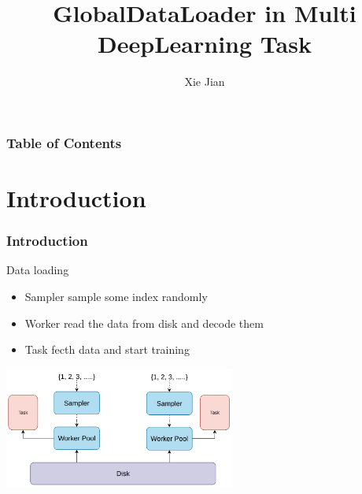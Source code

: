 \documentclass[notheorems, aspectratio=54]{beamer}
\title[GlobalDataLoader in Multi DeepLearning Task]{GlobalDataLoader in Multi DeepLearning Task}
\author{Xie Jian}
\institute[]{I2EC, ICS, NJU}
\begin{document}
\begin{frame}
    \titlepage
\end{frame}


\begin{frame}
    \frametitle{Table of Contents}
    \tableofcontents
\end{frame}

\section{Introduction}
\begin{frame}
    \frametitle{Introduction}
    \begin{block}{Data loading}
        \begin{itemize}
            \item Sampler sample some index randomly
            \item Worker read the data from disk and decode them
            \item Task fecth data and start training
        \end{itemize}
    \end{block}
    \begin{center}
        \includegraphics[height=4cm]{global_img_dir/data_pipeline.png}
    \end{center}
\end{frame}
\end{document}
